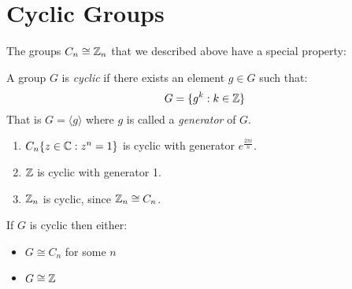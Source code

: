 \documentclass[../main.tex]{subfiles}
\begin{document}
\section{Cyclic Groups}
The groups $C_n \cong \mathbb{Z}_n$ that we described above have a special property:
\begin{definition}
  A group $G$ is \textit{cyclic} if there exists an element $g \in G$ such that:
  \[
    G = \{g^{k} : k \in \mathbb{Z}\}
  \]
  That is $G = \langle g \rangle$ where $g$ is called a \textit{generator} of $G$.
\end{definition}
\begin{example}
  \begin{enumerate}
    \item $C_n \{z \in \mathbb{C}: z^{n} = 1\}$ is cyclic with generator $e^{\frac{2\pi i}{n}}$.
    \item $\mathbb{Z}$ is cyclic with generator 1.
    \item $\mathbb{Z}_n$ is cyclic, since $\mathbb{Z}_n \cong C_n$.
  \end{enumerate}
\end{example}
\begin{theorem}
  If $G$ is cyclic then either:
  \begin{itemize}
    \item $G \cong C_n$ for some $n$
    \item $G \cong \mathbb{Z}$
  \end{itemize}
\end{theorem}
\end{document}
